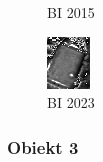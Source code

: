 \documentclass[a4paper,12pt]{article}  %
\begin{document}
\begin{figure}[H]
\begin{minipage}{0.24\textwidth}
        \caption*{BI 2015}
    \end{minipage}
    \begin{minipage}{0.24\textwidth}
        \centering
        \includegraphics[width=\linewidth]{spektralne/bi_budynek0_2023.png}
        \caption*{BI 2023}
    \end{minipage}
\end{figure}

\subsubsection{Obiekt 3}
\end{document}
